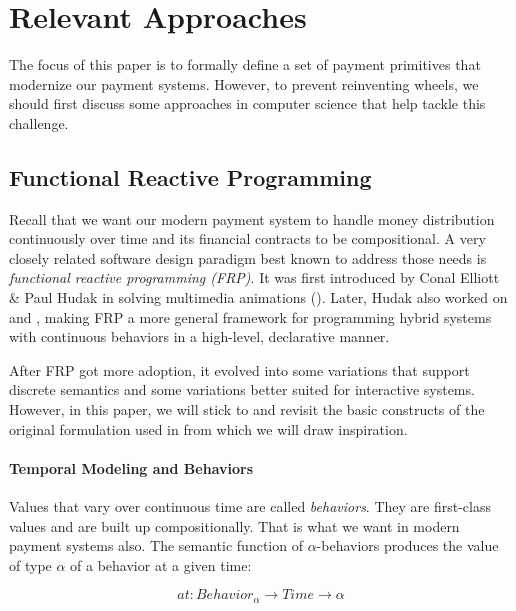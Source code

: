 

\section{Relevant Approaches}

The focus of this paper is to formally define a set of payment primitives that modernize our payment
systems. However, to prevent reinventing wheels, we should first discuss some approaches in computer
science that help tackle this challenge.

\subsection{Functional Reactive Programming}

Recall that we want our modern payment system to handle money distribution continuously over time
and its financial contracts to be compositional. A very closely related software design paradigm
best known to address those needs is \textit{functional reactive programming (FRP)}.  It was first
introduced by Conal Elliott \& Paul Hudak in solving multimedia animations
(\cite{elliott1997functional}). Later, Hudak also worked on \cite{hudak2002arrows} and
\cite{wan2000functional}, making FRP a more general framework for programming hybrid systems with
continuous behaviors in a high-level, declarative manner.

After FRP got more adoption, it evolved into some variations that support discrete semantics and
some variations better suited for interactive systems. However, in this paper, we will stick to and
revisit the basic constructs of the original formulation used in \cite{elliott1997functional} from
which we will draw inspiration.

\paragraph{Temporal Modeling and Behaviors}

Values that vary over continuous time are called \textit{behaviors}. They are first-class values and
are built up compositionally. That is what we want in modern payment systems also. The semantic
function of $\alpha$-behaviors produces the value of type $\alpha$ of a behavior at a given time:

\begin{equation}
    at : Behavior_{\alpha} \rightarrow Time \rightarrow \alpha
\end{equation}

